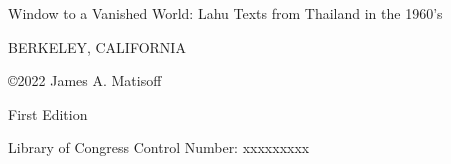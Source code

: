 \vspace{15em}
\thispagestyle{empty}
\begin{center}
Window to a Vanished World: Lahu Texts from Thailand in the 1960’s

BERKELEY, CALIFORNIA

\copyright 2022 James A. Matisoff

First Edition


Library of Congress Control Number:  xxxxxxxxx


\vspace{10em}
\date{Compiled on \today\ at \currenttime}
\end{center}



